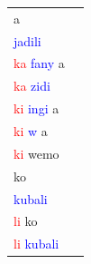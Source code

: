 \documentclass[output=paper,colorlinks,citecolor=brown,
]{langscibook}
\begin{document}
\begin{table}
\lsptoprule
\begin{minipage}{.24\textwidth}
\begin{tabular}{ll} 
a \\
\textcolor{blue}{jadili}   \\
\textcolor{red}{ka} \textcolor{blue}{fany} a     \\ 
\textcolor{red}{ka} \textcolor{blue}{zidi}       \\ 
\textcolor{red}{ki} \textcolor{blue}{ingi} a     \\ 
\textcolor{red}{ki} \textcolor{blue}{w} a  \\
\textcolor{red}{ki} wemo   \\
ko   \\
\textcolor{blue}{kubali}   \\   
\textcolor{red}{li} ko  \\
\textcolor{red}{li} \textcolor{blue}{kubali}      \\ 


\end{tabular}
\end{minipage}
\end{table}
\end{document}
